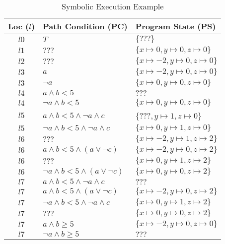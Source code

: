 \documentclass[11pt]{article}
\begin{document}
\begin{table}[h]
    \centering
    \caption{Symbolic Execution Example}\label{tab:symbolic-execution}
    \begin{tabular}{c|l|l}
\toprule
\textbf{Loc ($l$)} & \textbf{Path Condition} (PC) & \textbf{Program State} (PS) \\
\midrule
$l0$ & $T$ & $\{???\}$ \\
$l1$ & $???$ & $\{x\mapsto0, y\mapsto0, z\mapsto0\}$ \\
$l2$ & $???$ & $\{x\mapsto-2, y\mapsto0, z\mapsto0\}$ \\
\midrule
$l3$ & $a$ & $\{x\mapsto-2, y\mapsto0, z\mapsto0\}$ \\
$l3$ & $\lnot a$ & $\{x\mapsto0, y\mapsto0, z\mapsto0\}$ \\
\midrule
$l4$ & $a \land b < 5$ & $???$ \\
$l4$ & $\lnot a \land b < 5$ & $\{x\mapsto0, y\mapsto0, z\mapsto0\}$ \\
\midrule
$l5$ & $a \land b < 5 \land \lnot a \land c$ & $\{$???$, y\mapsto1, z\mapsto0\}$ \\
$l5$ & $\lnot a \land b < 5 \land \lnot a \land c$ & $\{x\mapsto0, y\mapsto1, z\mapsto0\}$ \\
\midrule
$l6$ & $???$ & $\{x\mapsto-2, y\mapsto1, z\mapsto2\}$ \\
$l6$ & $a \land b < 5 \land (a \lor \lnot c)$ & $\{x\mapsto-2, y\mapsto0, z\mapsto2\}$ \\
$l6$ & $???$ & $\{x\mapsto0, y\mapsto1, z\mapsto2\}$ \\
$l6$ & $\lnot a \land b < 5 \land (a \lor \lnot c)$ & $\{x\mapsto0, y\mapsto0, z\mapsto2\}$ \\
\midrule
$l7$ & $a \land b < 5 \land \lnot a \land c$ & $???$ \\
$l7$ & $a \land b < 5 \land (a \lor \lnot c)$ & $\{x\mapsto-2, y\mapsto0, z\mapsto2\}$ \\
$l7$ & $\lnot a \land b < 5 \land \lnot a \land c$ & $\{x\mapsto0, y\mapsto1, z\mapsto2\}$ \\
$l7$ & $???$ & $\{x\mapsto0, y\mapsto0, z\mapsto2\}$ \\

$l7$ & $a \land b \ge 5$ & $\{x\mapsto-2, y\mapsto0, z\mapsto0\}$ \\
$l7$ & $\lnot a \land b \ge 5 $ & $???$\\
\bottomrule
\end{tabular}
\end{table}

\newpage
\
\newpage
\end{document}
